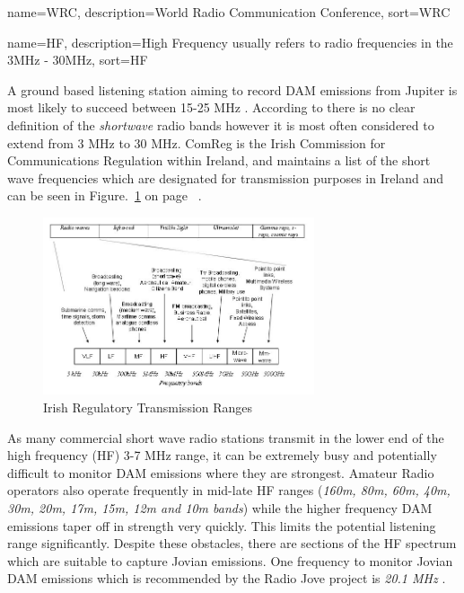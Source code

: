 %
{
  name={WRC},
  description={World Radio Communication Conference},
  sort=WRC
}
%

%
{
  name={HF},
  description={High Frequency usually refers to radio frequencies in the 3MHz - 30MHz},
  sort=HF
}
%

A ground based listening station aiming to record \gls{DAM} emissions from Jupiter is most likely to succeed between 15-25 MHz \citep{wilkinson94}. According to \cite{arrl-00} there is no clear definition of the \textit{shortwave} radio bands however it is most often considered to extend from 3 MHz to 30 MHz. ComReg is the Irish Commission for Communications Regulation within Ireland, and maintains a list of the short wave frequencies which are designated for transmission purposes in Ireland and can be seen in Figure.~\ref{fig:irish_electromagnetic_transmission_ranges} on page~\pageref{fig:irish_electromagnetic_transmission_ranges} \citep{comreg14}.

%
\begin{figure}[here]
\centering
\includegraphics[width=8cm]{images/06}
\caption{Irish Regulatory Transmission Ranges \citep{comreg14}}
\label{fig:irish_electromagnetic_transmission_ranges}
\end{figure}
%

As many commercial short wave radio stations transmit in the lower end of the high frequency (\gls{HF}) 3-7 MHz range, it can be extremely busy and potentially difficult to monitor \gls{DAM} emissions where they are strongest. Amateur Radio operators also operate frequently in mid-late \gls{HF} ranges (\textit{160m, 80m, 60m, 40m, 30m, 20m, 17m, 15m, 12m and 10m bands}) while the higher frequency \gls{DAM} emissions taper off in strength very quickly. This limits the potential listening range significantly. Despite these obstacles, there are sections of the \gls{HF} spectrum which are suitable to capture Jovian emissions. One frequency to monitor Jovian \gls{DAM} emissions which is recommended by the Radio Jove project is \textit{20.1 MHz} \citep{nasa12}. 

